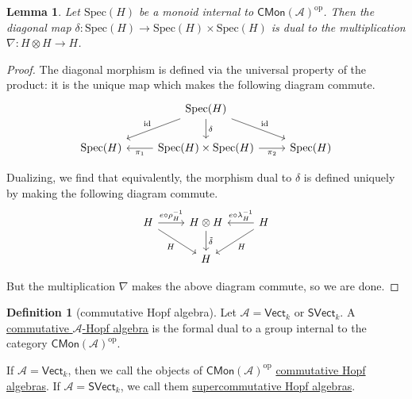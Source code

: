 \documentclass[a4paper,10pt]{scrreprt}
\newcommand{\defn}[1]{\ul{#1}}
\newcommand{\spec}{\mathrm{Spec}}
\theoremstyle{definition}
\newtheorem{definition}{Definition}[section]
\theoremstyle{plain}
\newtheorem{lemma}{Lemma}[section]
\theoremstyle{remark}
\begin{document}
\begin{lemma}
  \label{lemma:multiplicationisdualtodiagonalmap}
  Let $\spec(H)$ be a monoid internal to $\mathsf{CMon}(\mathscr{A})^{\mathrm{op}}$. Then the diagonal map $\delta\colon \spec(H) \to \spec(H) \times \spec(H)$ is dual to the multiplication $\nabla\colon H \otimes H \to H$.
\end{lemma}
\begin{proof}
  The diagonal morphism is defined via the universal property of the product: it is the unique map which makes the following diagram commute.
  \begin{equation*}
    \begin{tikzcd}
      & \spec(H)
      \arrow[dl, swap, "\mathrm{id}"]
      \arrow[dr, "\mathrm{id}"]
      \arrow[d, "\delta"]
      \\
      \spec(H)
      & \spec(H) \times \spec(H)
      \arrow[l, "\pi_{1}"]
      \arrow[r, swap, "\pi_{2}"]
      & \spec(H)
    \end{tikzcd}
  \end{equation*}

  Dualizing, we find that equivalently, the morphism dual to $\delta$ is defined uniquely by making the following diagram commute.
  \begin{equation*}
    \begin{tikzcd}
      H
      \arrow[r, "e \circ \rho_{H}^{-1}"]
      \arrow[rd, swap, "H"]
      & H \otimes H
      \arrow[d, "\tilde{\delta}"]
      & H
      \arrow[ld, "H"]
      \arrow[l, swap, "e \circ \lambda_{H}^{-1}"]
      \\
      & H
    \end{tikzcd}
  \end{equation*}

  But the multiplication $\nabla$ makes the above diagram commute, so we are done.
\end{proof}

\begin{definition}[commutative Hopf algebra]
  \label{def:superornotcommutativehopfalgebra}
  Let $\mathscr{A} = \mathsf{Vect}_{k}$ or $\mathsf{SVect}_{k}$. A \defn{commutative $\mathscr{A}$-Hopf algebra} is the formal dual to a group internal to the category $\mathsf{CMon}(\mathscr{A})^{\mathrm{op}}$.

  If $\mathscr{A} = \mathsf{Vect}_{k}$, then we call the objects of $\mathsf{CMon}(\mathscr{A})^{\mathrm{op}}$ \defn{commutative Hopf algebras}. If $\mathscr{A} = \mathsf{SVect}_{k}$, we call them \defn{supercommutative Hopf algebras}.
\end{definition}
\end{document}
